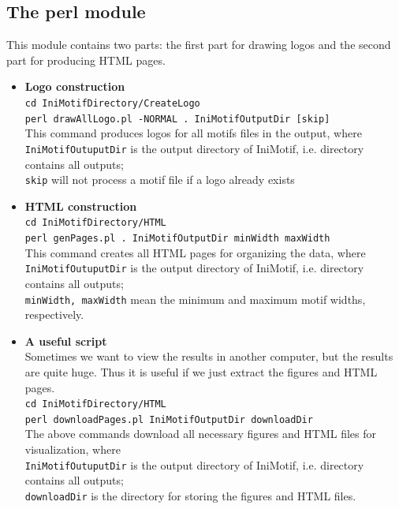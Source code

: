 \documentclass[a4paper,10pt]{article}
\begin{document}
\subsection{The perl module}
This module contains two parts: the first part for drawing logos and the second part for producing HTML pages.
\begin{itemize}
 \item \textbf{Logo construction} \\
   \texttt{cd IniMotifDirectory/CreateLogo} \\
   \texttt{perl drawAllLogo.pl -NORMAL . IniMotifOutputDir [skip]} \\
   This command produces logos for all motifs files in the output, where \\
   \texttt{IniMotifOutuputDir} is the output directory of IniMotif, i.e. directory contains all outputs; \\
   \texttt{skip} will not process a motif file if a logo already exists

 \item \textbf{HTML construction} \\
   \texttt{cd IniMotifDirectory/HTML} \\
   \texttt{perl genPages.pl . IniMotifOutputDir minWidth maxWidth} \\
   This command creates all HTML pages for organizing the data, where \\
   \texttt{IniMotifOutuputDir} is the output directory of IniMotif, i.e. directory contains all outputs;\\
   \texttt{minWidth, maxWidth} mean the minimum and maximum motif widths, respectively.

 \item \textbf{A useful script} \\
   Sometimes we want to view the results in another computer, but the results are quite huge. Thus it is useful if we just extract the figures and HTML pages. \\
   \texttt{cd IniMotifDirectory/HTML} \\
   \texttt{perl downloadPages.pl IniMotifOutputDir downloadDir} \\
   The above commands download all necessary figures and HTML files for visualization, where \\
   \texttt{IniMotifOutuputDir} is the output directory of IniMotif, i.e. directory contains all outputs;\\
   \texttt{downloadDir} is the directory for storing the figures and HTML files.\\
\end{itemize}
\end{document}
